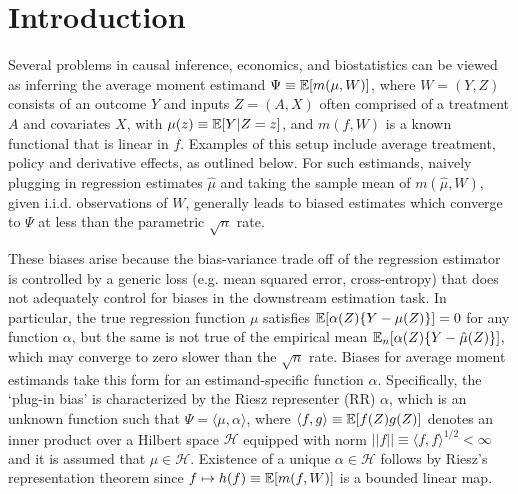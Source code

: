 

\section{Introduction}

Several problems in causal inference, economics, and biostatistics can be viewed as inferring the average moment estimand $\Psi \equiv\mathbb{E}[m(\mu, W)]$, where $W = (Y,Z)$ consists of an outcome $Y$ and inputs $Z = (A,X)$ often comprised of a treatment $A$ and covariates $X$, with $\mu(z) \equiv \mathbb{E}[Y|Z=z]$, and $m(f,W)$ is a known functional that is linear in $f$. Examples of this setup include average treatment, policy and derivative effects, as outlined below. For such estimands, naively plugging in regression estimates $\hat{\mu}$ and taking the sample mean of $m(\hat{\mu}, W)$, given i.i.d. observations of $W$, generally leads to biased estimates which converge to $\Psi$ at less than the parametric $\sqrt{n}$ rate.

These biases arise because the bias-variance trade off of the regression estimator is controlled by a generic loss (e.g. mean squared error, cross-entropy) that does not adequately control for biases in the downstream estimation task. In particular, the true regression function $\mu$ satisfies $\mathbb{E}[\alpha(Z)\{Y-\mu(Z)\}] = 0$ for any function $\alpha$, but the same is not true of the empirical mean $\mathbb{E}_n[\alpha(Z)\{Y-\hat{\mu}(Z)\}]$, which may converge to zero slower than the $\sqrt{n}$ rate. Biases for average moment estimands take this form for an estimand-specific function $\alpha$. Specifically, the `plug-in bias' is characterized by the Riesz representer (RR) $\alpha$, which is an unknown function such that $\Psi = \langle \mu, \alpha \rangle$, where $\langle f, g \rangle \equiv \mathbb{E}[f(Z)g(Z)]$ denotes an inner product over a Hilbert space $\mathcal{H}$ equipped with norm $||f|| \equiv \langle f, f \rangle ^{1/2} < \infty$ and it is assumed that $\mu\in \mathcal{H}$. Existence of a unique $\alpha \in \mathcal{H}$ follows by Riesz's representation theorem since $f \mapsto h(f) \equiv \mathbb{E}[m(f, W)]$ is a bounded linear map. %


